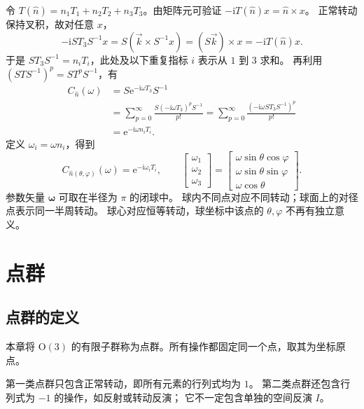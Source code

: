 令 $T\left(\hat n\right)=n_1T_1+n_2T_2+n_3T_3$。由矩阵元可验证
$-\mathrm{i}T\left(\hat n\right)x=\hat n\times x$。
正常转动保持叉积，故对任意 $x$，
\begin{equation}
-\mathrm{i}ST_3S^{-1}x=S\left(\vec k\times S^{-1}x\right)
=\left(S\vec k\right)\times x=-\mathrm{i}T\left(\hat n\right)x.
\end{equation}
于是 $ST_3S^{-1}=n_iT_i$，此处及以下重复指标 $i$ 表示从 $1$ 到 $3$ 求和。
再利用 $\left(STS^{-1}\right)^p=ST^pS^{-1}$，有
\begin{align}
C_{\hat n}\left(\omega\right)&=S\mathrm{e}^{-\mathrm{i}\omega T_3}S^{-1}\\
&=\sum_{p=0}^{\infty}\frac{S\left(-\mathrm{i}\omega T_3\right)^pS^{-1}}{p!}
=\sum_{p=0}^{\infty}\frac{\left(-\mathrm{i}\omega ST_3S^{-1}\right)^p}{p!}\\
&=\mathrm{e}^{-\mathrm{i}\omega n_iT_i}.
\end{align}
定义 $\omega_i=\omega n_i$，得到
\begin{equation}
C_{\hat n\left(\theta,\varphi\right)}\left(\omega\right)=\mathrm{e}^{-\mathrm{i}\omega_iT_i},\qquad
\begin{bmatrix}\omega_1\\\omega_2\\\omega_3\end{bmatrix}
=\begin{bmatrix}\omega\sin\theta\cos\varphi\\\omega\sin\theta\sin\varphi\\\omega\cos\theta\end{bmatrix}.
\end{equation}
参数矢量 $\bm\omega$ 可取在半径为 $\pi$ 的闭球中。
球内不同点对应不同转动；球面上的对径点表示同一半周转动。
球心对应恒等转动，球坐标中该点的 $\theta,\varphi$ 不再有独立意义。

\section{点群}
\subsection{点群的定义}
\begin{definition}
本章将 $\mathrm{O}\left(3\right)$ 的有限子群称为点群。所有操作都固定同一个点，取其为坐标原点。
\end{definition}
第一类点群只包含正常转动，即所有元素的行列式均为 $1$。
第二类点群还包含行列式为 $-1$ 的操作，如反射或转动反演；
它不一定包含单独的空间反演 $I$。

